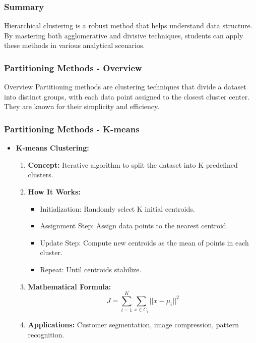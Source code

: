 \documentclass{beamer}
\begin{document}
\begin{frame}[fragile]
    \frametitle{Summary}
    Hierarchical clustering is a robust method that helps understand data structure. By mastering both agglomerative and divisive techniques, students can apply these methods in various analytical scenarios.
\end{frame}

\begin{frame}[fragile]
    \frametitle{Partitioning Methods - Overview}
    \begin{block}{Overview}
        Partitioning methods are clustering techniques that divide a dataset into distinct groups, with each data point assigned to the closest cluster center. They are known for their simplicity and efficiency.
    \end{block}
\end{frame}

\begin{frame}[fragile]
    \frametitle{Partitioning Methods - K-means}
    \begin{itemize}
        \item \textbf{K-means Clustering:}
        \begin{enumerate}
            \item \textbf{Concept:} Iterative algorithm to split the dataset into K predefined clusters.
            \item \textbf{How It Works:}
            \begin{itemize}
                \item Initialization: Randomly select K initial centroids.
                \item Assignment Step: Assign data points to the nearest centroid.
                \item Update Step: Compute new centroids as the mean of points in each cluster.
                \item Repeat: Until centroids stabilize.
            \end{itemize}
            \item \textbf{Mathematical Formula:}
            \begin{equation}
                J = \sum_{i=1}^{K} \sum_{x \in C_i} ||x - \mu_i||^2
            \end{equation}
            \item \textbf{Applications:} Customer segmentation, image compression, pattern recognition.
        \end{enumerate}
    \end{itemize}
\end{frame}
\end{document}
